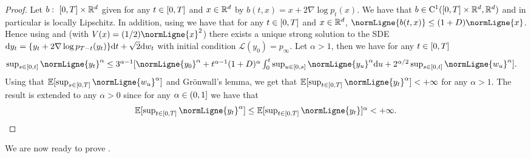 \begin{proof}
  Let $b: \ \left[0,T\right] \times \mathbb{R}^d$ given for any $t \in \left[0,T\right]$ and
  $x \in \mathbb{R}^d$ by $b(t,x) = x + 2 \nabla \log p_t(x)$. We have that
  $b \in \mathrm{C}^1(\left[0,T\right] \times \mathbb{R}^d, \mathbb{R}^d)$ and in particular is
  locally Lipschitz. In addition, using  we have that
  for any $t \in \left[0,T\right]$ and $x \in \mathbb{R}^d$,
  $\normLigne{b(t,x)} \leq (1 + D)\normLigne{x}$. Hence using \cite[Theorem 2.3,
  Theorem 3.1]{ikeda1989sto} and \cite[Theorem 2.1]{meyn1993criteria_iii} (with
  $V(x) = (1/2)\normLigne{x}^2$) there exists a unique strong solution to the
  SDE
  $\mathrm{d} y_t = \{ y_t + 2 \nabla \log p_{T-t}(y_t)\} \mathrm{d} t + \sqrt{2}
  \mathrm{d} w_t$ with initial condition $\mathcal{L}(y_0) = p_\infty$. Let
  $\alpha > 1$, then we have for any $t \in \left[0,T\right]$
  \begin{align}
    \textstyle{\sup_{s \in \ccint{0,t}} \normLigne{y_t}^\alpha} &\leq \textstyle{3^{\alpha-1} [\normLigne{y_0}^\alpha + t^{\alpha-1}(1+D)^\alpha\int_0^t \sup_{u \in \ccint{0,s}} \normLigne{y_u}^\alpha \rmd u + 2^{\alpha/2} \sup_{s \in \ccint{0,t}} \normLigne{w_u}^\alpha]} . 
  \end{align}
  Using that $\expeLigne{\sup_{s \in \ccint{0,T}} \normLigne{w_u}^\alpha}$
  and Gr\"onwall's lemma, we get that
  $\expeLigne{\textstyle{\sup_{t \in \ccint{0,T}}
      \normLigne{y_t}^\alpha}}<+\infty$ for any $\alpha >1$. The result is
  extended to any $\alpha >0$ since for any $\alpha \in \left(0,1\right]$ we have
  that
  \begin{equation}
    \textstyle{\expeLigne{\textstyle{\sup_{t \in \ccint{0,T}}
      \normLigne{y_t}^\alpha}} \leq \expeLigne{\textstyle{\sup_{t \in \ccint{0,T}}
      \normLigne{y_t}}}^\alpha <+\infty} .
  \end{equation}

\end{proof}

We are now ready to prove .

